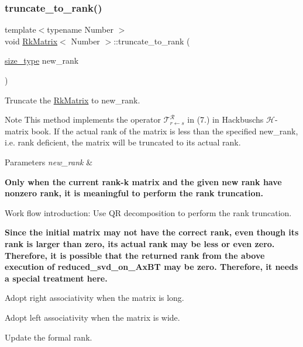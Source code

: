 \subsubsection{\texorpdfstring{truncate\+\_\+to\+\_\+rank()}{truncate\_to\_rank()}\hspace{0.1cm}{\footnotesize\ttfamily [1/2]}}
{\footnotesize\ttfamily template$<$typename Number $>$ \\
void \hyperlink{classRkMatrix}{Rk\+Matrix}$<$ Number $>$\+::truncate\+\_\+to\+\_\+rank (\begin{DoxyParamCaption}\item[{\hyperlink{classRkMatrix_add060bfc3a4cc77f858c3d6dd58cadd5}{size\+\_\+type}}]{new\+\_\+rank }\end{DoxyParamCaption})}

Truncate the \hyperlink{classRkMatrix}{Rk\+Matrix} to {\ttfamily new\+\_\+rank}.


\begin{DoxyDescription}
\item[Note ]This method implements the operator $\mathcal{T}_{r \leftarrow s}^{\mathcal{R}}$ in (7.) in Hackbusch\textquotesingle{}s $\mathcal{H}$-\/matrix book. If the actual rank of the matrix is less than the specified {\ttfamily new\+\_\+rank}, i.\+e. rank deficient, the matrix will be truncated to its actual rank. 
\end{DoxyDescription}
\begin{DoxyParams}{Parameters}
{\em new\+\_\+rank} & \\
\hline
\end{DoxyParams}
{\bfseries Only when the current rank-\/k matrix and the given new rank have nonzero rank, it is meaningful to perform the rank truncation.}

Work flow introduction\+: Use QR decomposition to perform the rank truncation.

{\bfseries Since the initial matrix may not have the correct rank, even though its {\ttfamily rank} is larger than zero, its actual {\ttfamily rank} may be less or even zero. Therefore, it is possible that the returned {\ttfamily rank} from the above execution of {\ttfamily reduced\+\_\+svd\+\_\+on\+\_\+\+Ax\+BT} may be zero. Therefore, it needs a special treatment here.}

Adopt right associativity when the matrix is long.

Adopt left associativity when the matrix is wide.

Update the formal rank.

